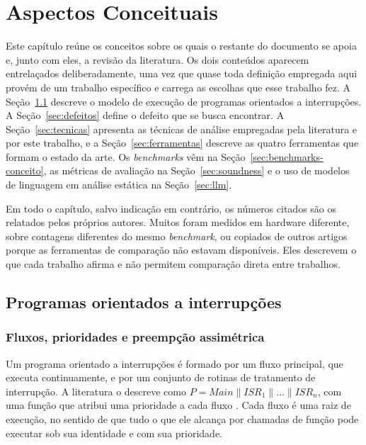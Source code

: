\chapter{Aspectos Conceituais} \label{cap:conceitos}

Este capítulo reúne os conceitos sobre os quais o restante do documento se
apoia e, junto com eles, a revisão da literatura. Os dois conteúdos aparecem
entrelaçados deliberadamente, uma vez que quase toda definição empregada aqui
provém de um trabalho específico e carrega as escolhas que esse trabalho fez. A
Seção~\ref{sec:interrupcoes} descreve o modelo de execução de programas
orientados a interrupções. A Seção~\ref{sec:defeitos} define o defeito que se
busca encontrar. A Seção~\ref{sec:tecnicas} apresenta as técnicas de análise
empregadas pela literatura e por este trabalho, e a Seção~\ref{sec:ferramentas}
descreve as quatro ferramentas que formam o estado da arte. Os
\textit{benchmarks} vêm na Seção~\ref{sec:benchmarks-conceito}, as métricas de
avaliação na Seção~\ref{sec:soundness} e o uso de modelos de linguagem em
análise estática na Seção~\ref{sec:llm}.

Em todo o capítulo, salvo indicação em contrário, os números citados são os
relatados pelos próprios autores. Muitos foram medidos em hardware diferente,
sobre contagens diferentes do mesmo \textit{benchmark}, ou copiados de outros
artigos porque as ferramentas de comparação não estavam disponíveis. Eles
descrevem o que cada trabalho afirma e não permitem comparação direta entre
trabalhos.

\section{Programas orientados a interrupções}
\label{sec:interrupcoes}

\subsection{Fluxos, prioridades e preempção assimétrica}

Um programa orientado a interrupções é formado por um fluxo principal, que
executa continuamente, e por um conjunto de rotinas de tratamento de
interrupção. A literatura o descreve como
$P = \mathit{Main} \parallel \mathit{ISR}_1 \parallel \dots \parallel
\mathit{ISR}_n$, com uma função que atribui uma prioridade a cada fluxo
\cite{bmc4av}. Cada fluxo é uma raiz de execução, no sentido de que tudo o que
ele alcança por chamadas de função pode executar sob sua identidade e com sua
prioridade.

